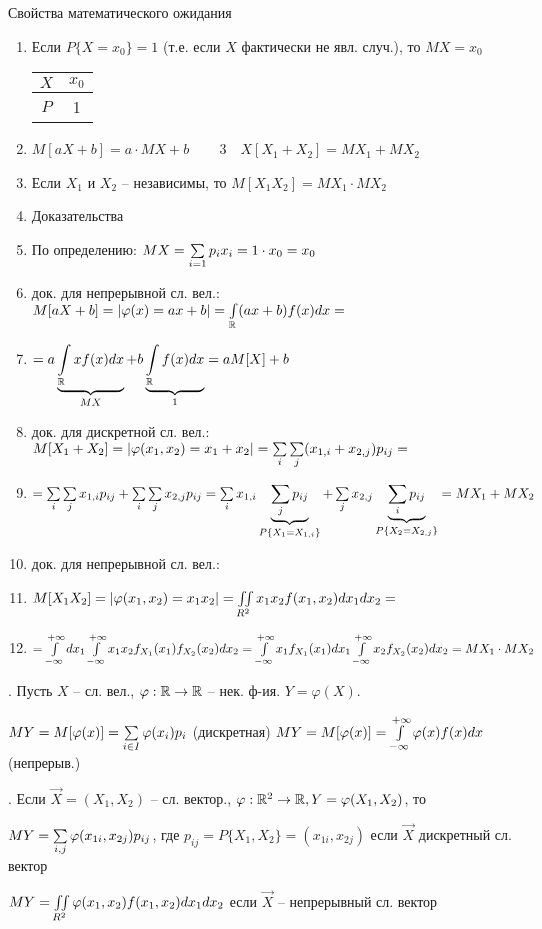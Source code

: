 Свойства математического ожидания
\begin{enumerate}[topsep=0pt, leftmargin=20pt, noitemsep, label=\arabic*\degree]
	\item Если $P\{X=x_0\}=1$ (т.е. если $X$ фактически не явл. случ.), то $MX=x_0$
	\begin{tabular}{ |c|c| } 
		\hline
		$X$ & $x_0$ \\ \hline
		$P$ & 1 \\ \hline
	\end{tabular}
	
	\item $M[aX+b]=a\cdot MX+b$ ~~~ 3\degree~~$X[X_1+X_2]=MX_1+MX_2$
	
	\setcounter{enumi}{3}
		
	\item Если $X_1$ и $X_2$ -- независимы, то $M[X_1X_2]=MX_1\cdot MX_2$
	
	\item [] Доказательства
	\setcounter{enumi}{0}
	
	\item По определению: $MX=\sum\limits_{i=1}p_i x_i=1\cdot x_0=x_0$
	
	\item док. для непрерывной сл. вел.: $M[aX+b]=|\varphi(x)=ax+b|=\int\limits_{\mathbb{R}}(ax+b)f(x)dx=$
	\item [] $= a\underbrace{\int\limits_{\mathbb{R}}xf(x)dx}_{MX}+b\underbrace{\int\limits_{\mathbb{R}}f(x)dx}_{1}=aM[X]+b$
	
	\item док. для дискретной сл. вел.: $M[X_1+X_2]=|\varphi(x_1,x_2)=x_1+x_2|=\sum\limits_{i}\sum\limits_{j}(x_{1,i}+x_{2,j})p_{ij}=$
	\item [] $=\sum\limits_{i}\sum\limits_{j}x_{1,i}p_{ij}+\sum\limits_{i}\sum\limits_{j}x_{2,j}p_{ij}
	=\sum\limits_{i}x_{1,i}\underbrace{\sum\limits_{j}p_{ij}}_{P\{X_1=X_{1,i}\}}+\sum\limits_{j}x_{2,j}\underbrace{\sum\limits_{i}p_{ij}}_{P\{X_2=X_{2,j}\}} = MX_1+MX_2$

	\item док. для непрерывной сл. вел.:
	\item [] $M[X_1X_2]=|\varphi(x_1,x_2)=x_1x_2|=\iint\limits_{R^2}x_1x_2f(x_1,x_2)dx_1dx_2=$
	\item [] $= \int\limits_{-\infty}^{+\infty}dx_1\int\limits_{-\infty}^{+\infty}x_1x_2f_{X_1}(x_1)f_{X_2}(x_2)dx_2=\int\limits_{-\infty}^{+\infty}x_1f_{X_1}(x_1)dx_1\int\limits_{-\infty}^{+\infty}x_2f_{X_2}(x_2)dx_2=MX_1\cdot MX_2$
\end{enumerate}

. Пусть $X$ -- сл. вел., $\varphi:\mathbb{R}\rightarrow\mathbb{R}$ -- нек. ф-ия. $Y=\varphi(X).$

$MY=M[\varphi(x)]=\sum\limits_{i\in I}\varphi(x_i)p_i$ (дискретная) $MY=M[\varphi(x)]=\int\limits_{-\infty}^{+\infty}\varphi(x)f(x)dx$ (непрерыв.)

. Если $\overrightarrow{X}=(X_1,X_2)$ -- сл. вектор., $\varphi:\mathbb{R}^2\rightarrow\mathbb{R}, Y=\varphi(X_1,X_2)$, то

$MY=\sum\limits_{i,j}\varphi(x_{1i},x_{2j})p_{ij}$, где $ p_{ij}=P\{X_1,X_2\}=(x_{1i},x_{2j})$ если $\overrightarrow{X}$ дискретный сл. вектор

$MY=\iint\limits_{R^2}\varphi(x_1,x_2)f(x_1,x_2)dx_1dx_2$ если $\overrightarrow{X}$ -- непрерывный сл. вектор

\clearpage
